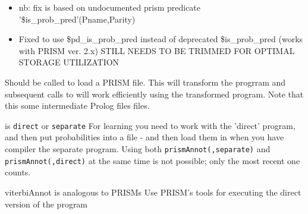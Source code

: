 \begin{itemize}
    \item nb: fix is based on undocumented prism predicate '\$is_prob_pred'(Pname,Parity)
    \item Fixed to use \$pd_is_prob_pred instead of deprecated \$is_prob_pred (works with PRISM ver. 2.x)
STILL NEEDS TO BE TRIMMED FOR OPTIMAL STORAGE UTILIZATION
\end{itemize}

\vspace{0.7cm}

\begin{description}
Should be called to load a PRISM file. This will transform the progrram and subsequent
calls to  will work efficiently using the transformed program.
Note that this some intermediate Prolog files files.

 is \verb$direct$ or \verb$separate$
For learning you need to work with the 'direct' program, and then
put probabilities into a file - and then load them in when you have compiler
the separate program.
Using both \verb$prismAnnot($\verb$,separate)$ and \verb$prismAnnot($\verb$,direct)$ at the same
time is not possible; only the most recent one counts.

viterbiAnnot is analogous to PRISMs 
Use PRISM's tools for executing the direct version of the program
\end{description}


